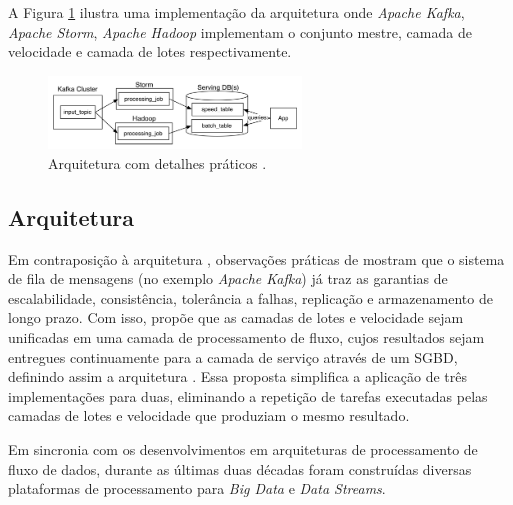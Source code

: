 A Figura \ref{fig:lambda} ilustra uma implementação da arquitetura \lambdaa
onde \emph{Apache Kafka}, \emph{Apache Storm}, \emph{Apache Hadoop}
implementam o conjunto mestre, camada de velocidade e camada de lotes
respectivamente.

\begin{figure}[ht]
\centering
\includegraphics[width=0.6\textwidth]{figuras/lambda.png}
\caption{Arquitetura \lambdaa com detalhes práticos \cite{Kreps2014}.}
\label{fig:lambda}
\end{figure}

\subsection{Arquitetura \kappaa}

Em contraposição à arquitetura \lambdaa, observações práticas de 
 mostram que o sistema de fila de mensagens
(no exemplo \emph{Apache Kafka}) já traz as garantias de
escalabilidade, consistência, tolerância a falhas, replicação e armazenamento de longo prazo.
Com isso,  propõe que as camadas de lotes e velocidade sejam
unificadas em uma camada de processamento de fluxo, cujos resultados sejam entregues
continuamente para a camada de serviço através de um SGBD, definindo assim a arquitetura \kappaa.
Essa proposta simplifica a aplicação de três implementações para duas, eliminando a
repetição de tarefas executadas pelas camadas de lotes e velocidade que
produziam o mesmo resultado.



Em sincronia com os desenvolvimentos em arquiteturas de processamento de fluxo de dados,
durante as últimas duas décadas foram construídas diversas plataformas de
processamento para \emph{Big Data} e \emph{Data Streams}.

